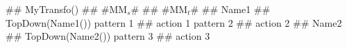 \begin{tomcode4}[caption=Schéma global d'une transformation de modèle avec {\tom},label=code:formeSyntaxeTransfo]
  ## MyTransfo() #\tomgray{:}# #MM$_{s}$# #\tomgray{->}# #MM$_{t}$#
  ## Name1 ## TopDown(Name1())
      pattern 1 #\tomgray{->}# action 1
      pattern 2 #\tomgray{->}# action 2
    ## Name2 ## TopDown(Name2())
      pattern 3 #\tomgray{->}# action 3
\end{tomcode4}
